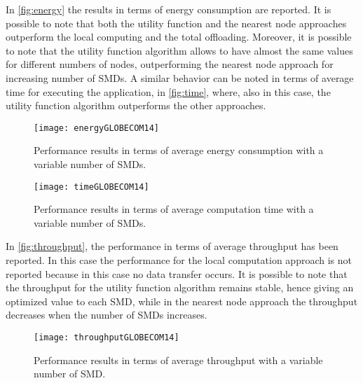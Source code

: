 \documentclass[twoside,openright]{report}
\newenvironment{boxedalgorithmic}
{\begin{lrbox}{\ieeealgbox}
\begin{minipage}{\dimexpr\columnwidth-2\fboxsep-2\fboxrule}
\begin{algorithmic}}
{\end{algorithmic}
\end{minipage}
\end{lrbox}\noindent\fbox{\usebox{\ieeealgbox}}}
\begin{document}
In \autoref{fig:energy} the results in terms of energy consumption are reported. It is possible to note that both the utility function and the nearest node approaches outperform the local computing and the total offloading. Moreover, it is possible to note that the utility function algorithm allows to have almost the same values for different numbers of nodes, outperforming the nearest node approach for increasing number of \glspl{SMD}. A similar behavior can be noted in terms of average time for executing the application, in \autoref{fig:time}, where, also in this case, the utility function algorithm outperforms the other approaches.

\begin{figure}[tbp]
\centering
\texttt{[image: energyGLOBECOM14]}
\caption{Performance results in terms of average energy consumption with a variable number of SMDs.}
\label{fig:energy}
\end{figure}
%
\begin{figure}[tbp]
\centering
\texttt{[image: timeGLOBECOM14]}
\caption{Performance results in terms of average computation time with a variable number of SMDs.}
\label{fig:time}
\end{figure}


In \autoref{fig:throughput}, the performance in terms of average throughput has been reported. In this case the performance for the local computation approach is not reported because in this case no data transfer occurs. It is possible to note that the throughput for the utility function algorithm remains stable, hence giving an optimized value to each \gls{SMD}, while in the nearest node approach the throughput decreases when the number of \glspl{SMD} increases.


\begin{figure}[tbp]
\centering
\texttt{[image: throughputGLOBECOM14]}
\caption{Performance results in terms of average throughput with a variable number of SMD.}
\label{fig:throughput}
\end{figure}

%
\end{document}
